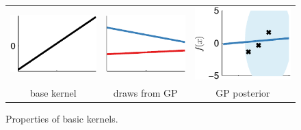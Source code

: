 \begin{figure}
\begin{tabular}{c|c|c}
\includegraphics[width=\fwb]{../figures/structure_examples/lin_kernel} &  \includegraphics[width=\fwb]{../figures/structure_examples/lin_kernel_draws} & \includegraphics[width=\fwb]{../figures/structure_examples/lin_kernel_post} \\
base kernel & draws from GP & GP posterior
\end{tabular}
\caption{ Properties of basic kernels.}
\label{fig:basic_kernels}
\end{figure}